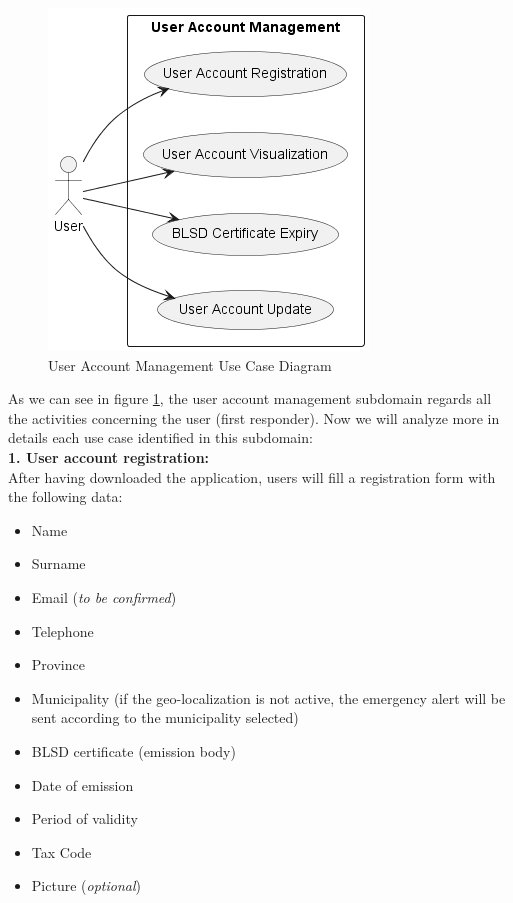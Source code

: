 \documentclass[11pt,a4paper]{article}
\begin{document}
\begin{figure}
    \centering
    \includegraphics[scale=0.7]{images/uml-user.png}
    \caption{User Account Management Use Case Diagram}
    \label{fig:uml-user}
\end{figure}

As we can see in figure \ref{fig:uml-user}, the user account management subdomain regards all the activities concerning the user (first responder). 
%
Now we will analyze more in details each use case identified in this subdomain: \\

\textbf{1. User account registration:} \\

After having downloaded the application, users will fill a registration form with the following data:

\begin{itemize}
    \item Name
    \item Surname
    \item Email (\textit{to be confirmed})
    \item Telephone
    \item Province
    \item Municipality (if the geo-localization is not active, the emergency alert will be sent according to the municipality selected)
    \item BLSD certificate (emission body)
    \item Date of emission
    \item Period of validity
    \item Tax Code
    \item Picture (\textit{optional})
\end{itemize}
\end{document}
